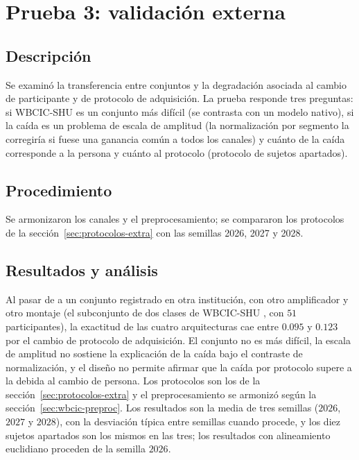 \section{Prueba 3: validación externa}
\label{cap:validacion-externa}

\subsection{Descripción} Se examinó la transferencia entre conjuntos y la degradación asociada al cambio de participante y de protocolo de adquisición.
La prueba responde tres preguntas: si WBCIC-SHU es un conjunto más difícil (se contrasta con un modelo
nativo), si la caída es un problema de escala de amplitud (la normalización por segmento la corregiría si fuese
una ganancia común a todos los canales) y cuánto de la caída corresponde a la persona y cuánto al protocolo
(protocolo de sujetos apartados).
\subsection{Procedimiento} Se armonizaron los canales y el preprocesamiento; se compararon los protocolos de la sección~\ref{sec:protocolos-extra} con las semillas 2026, 2027 y 2028.
\subsection{Resultados y análisis}


Al pasar de \openbmi{} a un conjunto registrado en otra institución, con otro amplificador y otro
montaje (el subconjunto de dos clases de WBCIC-SHU \cite{yang2025wbcic}, con $51$ participantes), la
exactitud de las cuatro arquitecturas cae entre $0.095$ y $0.123$ por el cambio de protocolo de adquisición.
El conjunto no es más difícil, la escala de amplitud no sostiene la explicación de la caída bajo el contraste
de normalización, y el diseño no permite afirmar que la caída por protocolo supere a la debida al cambio de
persona. Los protocolos son los de la
sección~\ref{sec:protocolos-extra} y el preprocesamiento se armonizó según la
sección~\ref{sec:wbcic-preproc}. Los resultados son la media de tres semillas ($2026$, $2027$ y $2028$), con
la desviación típica entre semillas cuando procede, y los diez sujetos apartados son los mismos en las tres;
los resultados con alineamiento euclidiano proceden de la semilla $2026$.

